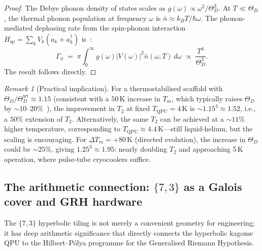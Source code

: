 \documentclass[11pt,oneside]{amsbook}
\numberwithin{equation}{section}
\theoremstyle{plain}
\theoremstyle{definition}
\theoremstyle{remark}
\newtheorem{remark}[theorem]{Remark}
\begin{document}
\begin{proof}
The Debye phonon density of states scales as $g(\omega)\propto\omega^2/\Theta_D^3$.
At $T\ll\Theta_D$, the thermal phonon population at frequency $\omega$ is
$\bar{n}\approx k_BT/\hbar\omega$.  The phonon-mediated dephasing rate
from the spin-phonon interaction $H_{\mathrm{sp}} = \sum_k V_k (a_k+a_k^\dagger)$
is~\cite{MortonEtAl2011}:
\[
  \Gamma_\phi \;=\; \pi\!\int_0^\infty g(\omega)|V(\omega)|^2\bar{n}(\omega,T)\,d\omega
  \;\propto\; \frac{T^4}{\Theta_D^3}.
\]
The result follows directly.
\end{proof}

\begin{remark}[Practical implication]
For a thermostabilised scaffold with $\Theta_D/\Theta_D^{\mathrm{wt}}
\approx 1.15$ (consistent with a $50\,\text{K}$ increase in $T_m$, which
typically raises $\Theta_D$ by $\sim 10$--$20\%$~\cite{ZaccaiEtAl2016}),
the improvement in $T_2$ at fixed $T_{\mathrm{QPU}} = 4\,\text{K}$ is
$\sim 1.15^3 \approx 1.52$, i.e., a $50\%$ extension of $T_2$.  Alternatively,
the same $T_2$ can be achieved at a $\sim 11\%$ higher temperature,
corresponding to $T_{\mathrm{QPU}} \approx 4.4\,\text{K}$---still liquid-helium,
but the scaling is encouraging.  For $\Delta T_m = +80\,\text{K}$ (directed
evolution), the increase in $\Theta_D$ could be $\sim 25\%$, giving
$1.25^3 \approx 1.95$: nearly doubling $T_2$ and approaching 5\,K operation,
where pulse-tube cryocoolers suffice.
\end{remark}

\subsection{The arithmetic connection: $\{7,3\}$ as a Galois cover and
  GRH hardware}
\label{subsec:hk_arithmetic}

The $\{7,3\}$ hyperbolic tiling is not merely a convenient geometry for
engineering; it has deep arithmetic significance that directly connects the
hyperbolic kagome QPU to the Hilbert--P\'olya programme for the Generalised
Riemann Hypothesis.
\end{document}
